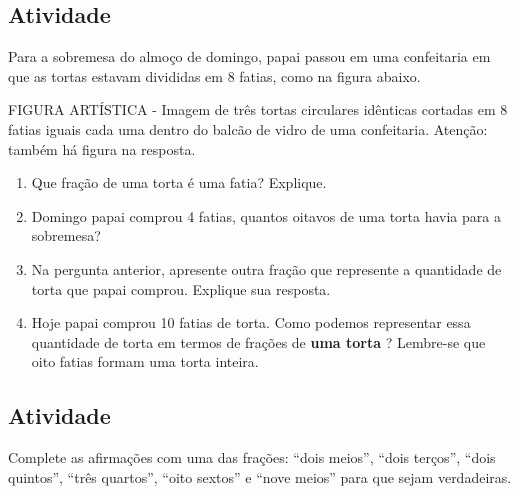 \documentclass[a4,12pt]{book}
\begin{document}
\subsection{Atividade}

Para a sobremesa do almoço de domingo, papai passou em uma confeitaria em que as tortas estavam divididas em 8 fatias, como na figura abaixo. 

\begin{imagem*}[breakable]{}{}   FIGURA ARTÍSTICA - Imagem de três tortas circulares idênticas cortadas em 8 fatias iguais cada uma dentro do balcão de vidro de uma confeitaria. Atenção: também há figura na resposta.  
\end{imagem*}

\begin{enumerate} [\quad a)] %
  \item     Que fração de uma torta é uma fatia? Explique.
  \item     Domingo papai comprou 4 fatias, quantos oitavos de uma torta havia para a sobremesa?
  \item     Na pergunta anterior, apresente outra fração que represente a quantidade de torta que papai comprou. Explique sua resposta.
  \item     Hoje papai comprou 10 fatias de torta. Como podemos representar essa quantidade de torta em termos de frações de     {\bf uma torta}    ? Lembre-se que oito fatias formam uma torta inteira.
\end{enumerate} %

\subsection{Atividade}

Complete as afirmações com uma das frações: ``dois meios'', ``dois terços'', ``dois quintos'', ``três quartos'', ``oito sextos'' e ``nove meios'' para que sejam verdadeiras.
\end{document}
